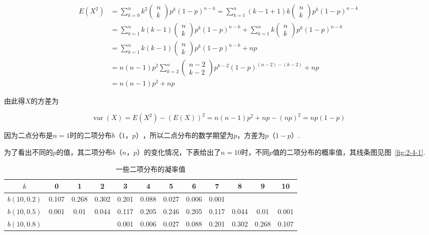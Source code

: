 \[
\begin{array}{ll}
{E\left(X^{2}\right)} & {=\sum_{k=0}^{n} k^{2} \left( 
	\begin{array}{c}
	{n} \\ 
	{k}
	\end{array}
	\right) 
	p^{k}(1-p)^{n-k}=\sum_{k=1}^{n}(k-1+1) k \left( 
	\begin{array}{c}{n} \\ 
	{k}
	\end{array}
	\right) 
	p^{k}(1-p)^{n-k}} \\ 
{}&{=\sum_{k=1}^{n} k(k-1) \left( 
	\begin{array}{c}{n} \\ 
	{k}
	\end{array}
	\right) 
	p^{k}(1-p)^{n-k}+\sum_{k=1}^{n} k \left( 
	\begin{array}{c}{n} \\ 
	{k}
	\end{array}
	\right) 
	p^{k}(1-p)^{n-k}} \\ 
{}&{=\sum_{k=1}^{n} k(k-1) \left( 
	\begin{array}{c}{n} \\ 
	{k}
	\end{array}
	\right) 
	p^{k}(1-p)^{n-k}+n p} \\ 
{}&{=n(n-1) p^{2} \sum_{k=2}^{n} \left( 
	\begin{array}{c}{n-2} \\ 
	{k-2}
	\end{array}
	\right) 
	p^{k-2}(1-p)^{(n-2)-(k-2)}+n p} \\ 
{}&{=n(n-1) p^{2}+n p}
\end{array}
\]

由此得$ X $的方差为

\[
\operatorname{var}(X)=E\left(X^{2}\right)-(E(X))^{2}=n(n-1) p^{2}+n p-(n p)^{2}=n p(1-p)
\]

因为二点分布是$ n=1 $时的二项分布$ b（1，p） $，所以二点分布的数学期望为$ p $，方差为$ p（1-p） $.

为了看出不同的$ p $的值，其二项分布$ b（n，p） $的变化情况，下表给出了$ n=10 $时，不同$ p $值的二项分布的概率值，其线条图见图~\ref{fig:2-4-1}.

\begin{table}[htbp]
	\centering
	\caption{一些二项分布的凝率值}
	\begin{tabular}{c|ccccccccccc}
		\toprule
		$ k $     & 0     & 1     & 2     & 3     & 4     & 5     & 6     & 7     & 8     & 9     & 10 \\\midrule
		$ b(10,0.2) $ & 0.107 & 0.268 & 0.302 & 0.201 & 0.088 & 0.027 & 0.006 & 0.001 &       &       &  \\
		$ b(10,0.5) $ & 0.001 & 0.01  & 0.044 & 0.117 & 0.205 & 0.246 & 0.205 & 0.117 & 0.044 & 0.01  & 0.001 \\
		$ b(10,0.8) $ &       &       &       & 0.001 & 0.006 & 0.027 & 0.088 & 0.201 & 0.302 & 0.268 & 0.107 \\\bottomrule
	\end{tabular}%
	\label{tab:2.4.1}%
\end{table}%

